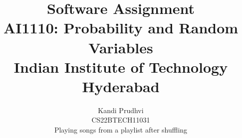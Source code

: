 \documentclass[12pt, journal]{IEEEtran}
\title{Software Assignment \\ \Large AI1110: Probability and Random Variables \\ \large Indian Institute of Technology Hyderabad}
\author{Kandi Prudhvi \\ \normalsize CS22BTECH11031 \\ \large Playing songs from a playlist after shuffling}
\DeclareMathOperator*{\Res}{Res}
\begin{document}
	\newtheorem{theorem}{Theorem}[section]
	\newtheorem{problem}{Problem}
	\newtheorem{proposition}{Proposition}[section]
	\newtheorem{lemma}{Lemma}[section]
	\newtheorem{corollary}[theorem]{Corollary}
	\newtheorem{example}{Example}[section]
	\newtheorem{definition}[problem]{Definition}
	\newcommand{\BEQA}{\begin{eqnarray}}
	\newcommand{\EEQA}{\end{eqnarray}}
	\newcommand{\define}{\stackrel{\triangle}{=}}

	


	\providecommand{\mbf}{\mathbf}
	\providecommand{\pr}[1]{\ensuremath{\Pr\left(#1\right)}}
	\providecommand{\qfunc}[1]{\ensuremath{Q\left(#1\right)}}
	\providecommand{\sbrak}[1]{\ensuremath{{}\left[#1\right]}}
	\providecommand{\lsbrak}[1]{\ensuremath{{}\left[#1\right.}}
	\providecommand{\rsbrak}[1]{\ensuremath{{}\left.#1\right]}}
	\providecommand{\brak}[1]{\ensuremath{\left(#1\right)}}
	\providecommand{\lbrak}[1]{\ensuremath{\left(#1\right.}}
	\providecommand{\rbrak}[1]{\ensuremath{\left.#1\right)}}
	\providecommand{\cbrak}[1]{\ensuremath{\left\{#1\right\}}}
	\providecommand{\lcbrak}[1]{\ensuremath{\left\{#1\right.}}
	\providecommand{\rcbrak}[1]{\ensuremath{\left.#1\right\}}}
	\theoremstyle{remark}
	\newtheorem{rem}{Remark}
	\newcommand{\sgn}{\mathop{\mathrm{sgn}}}
	\providecommand{\abs}[1]{\left\vert#1\right\vert}
	\providecommand{\res}[1]{\Res\displaylimits_{#1}} 
	\providecommand{\norm}[1]{\left\lVert#1\right\rVert}
	\providecommand{\mtx}[1]{\mathbf{#1}}
	\providecommand{\mean}[1]{E\left[ #1 \right]}
	\providecommand{\fourier}{\overset{\mathcal{F}}{ \rightleftharpoons}}
	\providecommand{\system}{\overset{\mathcal{H}}{ \longleftrightarrow}}
	\newcommand{\solution}{\noindent \textbf{Solution: }}
	\newcommand{\cosec}{\,\text{cosec}\,}
	\providecommand{\dec}[2]{\ensuremath{\overset{#1}{\underset{#2}{\gtrless}}}}
	\newcommand{\myvec}[1]{\ensuremath{\begin{pmatrix}#1\end{pmatrix}}}
	\newcommand{\mydet}[1]{\ensuremath{\begin{vmatrix}#1\end{vmatrix}}}
	
\end{document}
